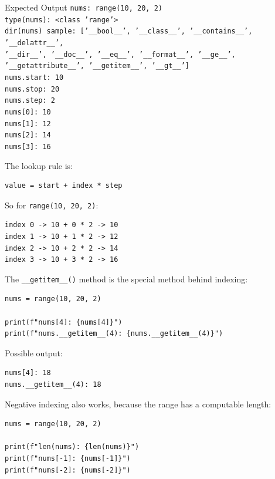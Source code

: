 \documentclass[a4paper,twoside]{report}
\begin{document}
\begin{iobox}{Expected Output}
\texttt{nums: range(10, 20, 2)} \\
\texttt{type(nums): <class 'range'>} \\
\texttt{dir(nums) sample: ['\_\_bool\_\_', '\_\_class\_\_', '\_\_contains\_\_', '\_\_delattr\_\_',} \\
\texttt{'\_\_dir\_\_', '\_\_doc\_\_', '\_\_eq\_\_', '\_\_format\_\_', '\_\_ge\_\_',} \\
\texttt{'\_\_getattribute\_\_', '\_\_getitem\_\_', '\_\_gt\_\_']} \\
\texttt{nums.start: 10} \\
\texttt{nums.stop: 20} \\
\texttt{nums.step: 2} \\
\texttt{nums[0]: 10} \\
\texttt{nums[1]: 12} \\
\texttt{nums[2]: 14} \\
\texttt{nums[3]: 16} \\
\end{iobox}


The lookup rule is:

\begin{verbatim}
value = start + index * step
\end{verbatim}

So for \texttt{range(10, 20, 2)}:

\begin{verbatim}
index 0 -> 10 + 0 * 2 -> 10
index 1 -> 10 + 1 * 2 -> 12
index 2 -> 10 + 2 * 2 -> 14
index 3 -> 10 + 3 * 2 -> 16
\end{verbatim}

The \texttt{\_\_getitem\_\_()} method is the special method behind indexing:

\begin{verbatim}
nums = range(10, 20, 2)

print(f"nums[4]: {nums[4]}")
print(f"nums.__getitem__(4): {nums.__getitem__(4)}")
\end{verbatim}

Possible output:

\begin{verbatim}
nums[4]: 18
nums.__getitem__(4): 18
\end{verbatim}

Negative indexing also works, because the range has a computable length:

\begin{verbatim}
nums = range(10, 20, 2)

print(f"len(nums): {len(nums)}")
print(f"nums[-1]: {nums[-1]}")
print(f"nums[-2]: {nums[-2]}")
\end{verbatim}
\end{document}
